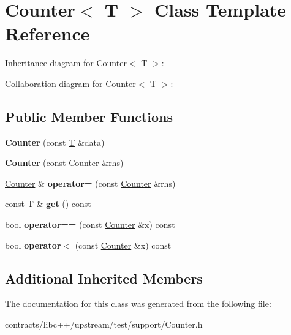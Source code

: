 \hypertarget{class_counter}{}\section{Counter$<$ T $>$ Class Template Reference}
\label{class_counter}


Inheritance diagram for Counter$<$ T $>$\+:


Collaboration diagram for Counter$<$ T $>$\+:
\subsection*{Public Member Functions}
\begin{DoxyCompactItemize}
\item 
\mbox{\label{class_counter_a73c8433e03d59b375d5b6c375ee3bff0}} 
{\bfseries Counter} (const \mbox{\hyperlink{struct_t}{T}} \&data)
\item 
\mbox{\label{class_counter_afa5ae7ae2ef905e10cdaf83e3919d6af}} 
{\bfseries Counter} (const \mbox{\hyperlink{class_counter}{Counter}} \&rhs)
\item 
\mbox{\label{class_counter_ab2d4dfe4f701c224ad8858d50f9770af}} 
\mbox{\hyperlink{class_counter}{Counter}} \& {\bfseries operator=} (const \mbox{\hyperlink{class_counter}{Counter}} \&rhs)
\item 
\mbox{\label{class_counter_a6bd44fca355c5abed458fd5b7a3a03dd}} 
const \mbox{\hyperlink{struct_t}{T}} \& {\bfseries get} () const
\item 
\mbox{\label{class_counter_afd3b563239ed762d8e3d9b272d6cec6a}} 
bool {\bfseries operator==} (const \mbox{\hyperlink{class_counter}{Counter}} \&x) const
\item 
\mbox{\label{class_counter_a75b858029929c22c4a2520a81d21865b}} 
bool {\bfseries operator$<$} (const \mbox{\hyperlink{class_counter}{Counter}} \&x) const
\end{DoxyCompactItemize}
\subsection*{Additional Inherited Members}


The documentation for this class was generated from the following file\+:\begin{DoxyCompactItemize}
\item 
contracts/libc++/upstream/test/support/Counter.\+h\end{DoxyCompactItemize}
